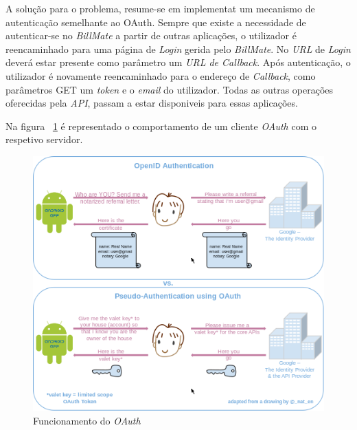 A solução para o problema, resume-se em implementat um mecanismo de autenticação semelhante ao OAuth. Sempre que existe a necessidade de autenticar-se no \emph{BillMate} a partir de outras aplicações, o utilizador é reencaminhado para uma página de \emph{Login} gerida pelo \emph{BillMate}. No \emph{URL} de \emph{Login} deverá estar presente como parâmetro um \emph{URL de Callback}. Após autenticação, o utilizador é novamente reencaminhado para o endereço de \emph{Callback}, como parâmetros GET um  \emph{token} e o \emph{email} do utilizador. Todas as outras operações oferecidas pela \emph{API}, passam a estar disponiveis para essas aplicações.

Na figura ~\ref{fig:oauth} é representado o comportamento de um cliente \emph{OAuth} com o respetivo servidor.

\begin{figure}[ht]
	\centering
	\includegraphics[width=.8\textwidth]{images/oauth}
	\caption{Funcionamento do \emph{OAuth}}
	\label{fig:oauth}
\end{figure}

